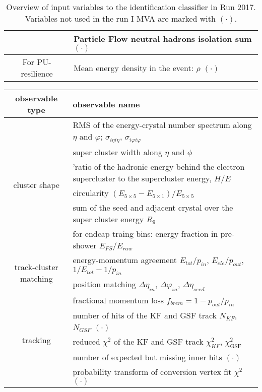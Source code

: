 \begin{table}[h!]
\begin{tabular}{c|l}
& Particle Flow neutral hadrons isolation sum $(\mathord{\cdot})$ \\
\hline
\multirow{1}{*}{For PU-resilience}
& Mean energy density in the event: $\rho$ $(\mathord{\cdot})$ \\
\hline %
\hline %
     \end{tabular}
\small
    \caption{Overview of input variables to the identification classifier in Run 2017. Variables not used in the run I MVA are marked with  $(\mathord{\cdot})$.}
    \label{tab:ele_ID_input_variables_17}
\end{table}

 \begin{table}[h!]
\scriptsize
    \centering
    \begin{tabular}{c|l}
\hline %
\hline %
observable type    &  observable name      	\\
\hline %

\multirow{6}{*}{cluster shape}
	&  RMS of the energy-crystal number spectrum along $\eta$ and $\varphi$; $\sigma_{i\eta i\eta}$, $\sigma_{i\varphi i\varphi}$		\\
	&  super cluster width along $\eta$ and $\phi$		\\
	&  'ratio of the hadronic energy behind the electron 
supercluster to the supercluster energy, $H/E$			\\
	&  circularity $(E_{5\times5} - E_{5\times1})/E_{5\times5}$			\\
	&  sum of the seed and adjacent crystal over the super cluster energy $R_{9}$			\\
	&  for endcap traing bins: energy fraction in pre-shower $E_{PS}/E_{raw}$			\\
\hline
\multirow{2}{*}{track-cluster matching}
	& energy-momentum agreement $E_{tot}/p_{in}$, $E_{ele}/p_{out}$, $1/E_{tot} - 1/p_{in}$ 			\\
	& position matching $\Delta\eta_{in}$, $\Delta\varphi_{in}$, $\Delta\eta_{seed}$			\\
\hline
\multirow{5}{*}{tracking}
        & fractional momentum loss $f_{brem} = 1 - p_{out}/p_{in}$	\\
        & number of hits of the KF and GSF track $N_{KF}$, $N_{GSF}$ $(\mathord{\cdot})$ \\
        & reduced $\chi^2$ of the KF and GSF track $\chi^{2}_{KF}$, $\chi^{2}_{\textrm{GSF}}$ \\
        & number of expected but missing inner hits $(\mathord{\cdot})$ 	\\
        & probability transform of conversion vertex fit $\chi^2$ $(\mathord{\cdot})$ \\


\end{tabular}
\end{table}
